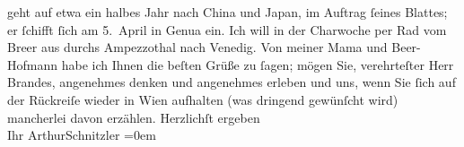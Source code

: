 \begin{ledgroupsized}[t]{13cm}
               geht auf etwa ein halbes Jahr nach China und Japan, im Auftrag ſeines Blattes; er ſchifft ſich am 5. April in Genua ein. Ich will in der Charwoche per Rad vom Bre{\geminationn}er aus durchs
                  Ampezzothal nach Venedig.\pend
           \pstart
           Von meiner Mama und Beer-Hofmann habe ich Ihnen die beſten Grüße zu
               ſagen; {\pb}mögen Sie, verehrteſter Herr Brandes,
               angenehmes denken und angenehmes erleben und uns, wenn Sie ſich auf der Rückreiſe
               wieder in Wien aufhalten (was dringend gewünſcht
               wird) mancherlei davon erzählen.\pend
           \pstart
           Herzlichſt ergeben{\\[\baselineskip]}Ihr \spacefill\mbox{ArthurSchnitzler}\pend
           \leftskip=0em{}          \endnumbering{}\end{ledgroupsized}  \newcommand{\dateiname}{L00787}\newcommand{\titel}{Arthur Schnitzler an Georg Brandes, 27. 3. 1898}\newcommand{\editorInnen}{Martin Anton Müller und Gerd-Hermann Susen}
            \footnotesize
\begin{ledgroupsized}[t]{11.5cm}
\end{ledgroupsized}
         
      